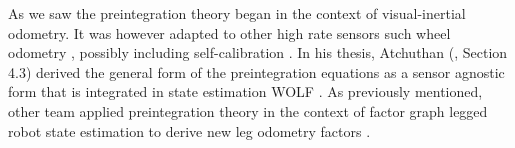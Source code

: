 As we saw the preintegration theory began in the context of visual-inertial odometry. It was however adapted to other high rate sensors such wheel odometry \cite{quan2019tightly}, 
possibly including self-calibration \cite{deray-19-selfcalib}. In his thesis, Atchuthan (\cite{atchuthan-18-thesis}, Section 4.3) derived the general form of the preintegration 
equations as a sensor agnostic form that is integrated in state estimation WOLF \cite{sola2021wolf}. As previously mentioned, other team applied preintegration theory in the 
context of factor graph legged robot state estimation to derive new leg odometry factors \cite{hartley2018legged, wisth2019robust, wisth2020preintegrated}.